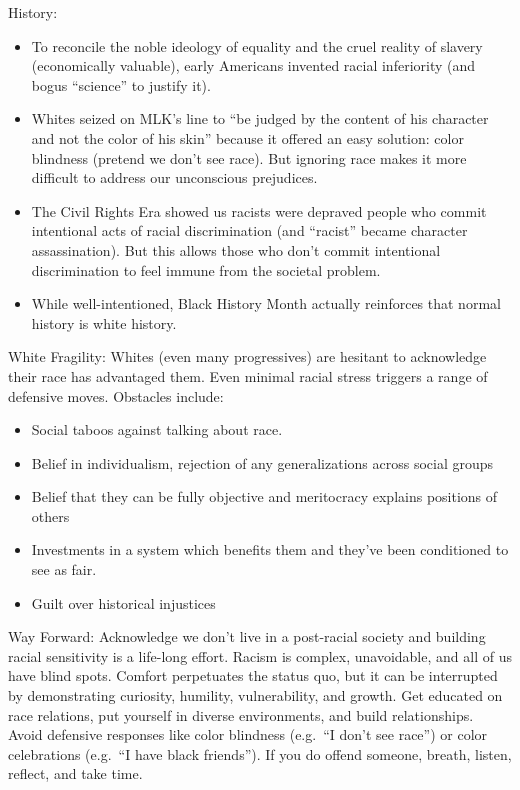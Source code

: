\documentclass[
]{article}
\begin{document}
History:

\begin{itemize}
\item
  To reconcile the noble ideology of equality and the cruel reality of
  slavery (economically valuable), early Americans invented racial
  inferiority (and bogus ``science'' to justify it).
\item
  Whites seized on MLK's line to ``be judged by the content of his
  character and not the color of his skin'' because it offered an easy
  solution: color blindness (pretend we don't see race). But ignoring
  race makes it more difficult to address our unconscious prejudices.
\item
  The Civil Rights Era showed us racists were depraved people who commit
  intentional acts of racial discrimination (and ``racist'' became
  character assassination). But this allows those who don't commit
  intentional discrimination to feel immune from the societal problem.
\item
  While well-intentioned, Black History Month actually reinforces that
  normal history is white history.
\end{itemize}

White Fragility: Whites (even many progressives) are hesitant to
acknowledge their race has advantaged them. Even minimal racial stress
triggers a range of defensive moves. Obstacles include:

\begin{itemize}
\item
  Social taboos against talking about race.
\item
  Belief in individualism, rejection of any generalizations across
  social groups
\item
  Belief that they can be fully objective and meritocracy explains
  positions of others
\item
  Investments in a system which benefits them and they've been
  conditioned to see as fair.
\item
  Guilt over historical injustices
\end{itemize}

Way Forward: Acknowledge we don't live in a post-racial society and
building racial sensitivity is a life-long effort. Racism is complex,
unavoidable, and all of us have blind spots. Comfort perpetuates the
status quo, but it can be interrupted by demonstrating curiosity,
humility, vulnerability, and growth. Get educated on race relations, put
yourself in diverse environments, and build relationships. Avoid
defensive responses like color blindness (e.g.~``I don't see race'') or
color celebrations (e.g.~``I have black friends''). If you do offend
someone, breath, listen, reflect, and take time.
\end{document}
